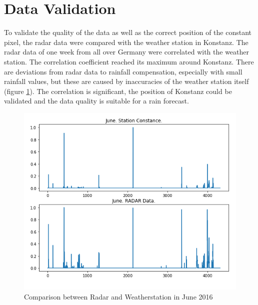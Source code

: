 \documentclass[oneside]{htwg-report}
\begin{document}
\section*{Data Validation}\label{data validation}
\begin{sloppypar}
To validate the quality of the data as well as the correct position of the constant pixel, the radar data were compared with the weather station in Konstanz.
The radar data of one week from all over Germany were correlated with the weather station.
The correlation coefficient reached its maximum around Konstanz.
There are deviations from radar data to rainfall compensation, especially with small rainfall values, but these are caused by inaccuracies of the weather station itself (figure \ref{fig:radar_station_daten_vergleich_June}).
The correlation is significant, the position of Konstanz could be validated and the data quality is suitable for a rain forecast.
\end{sloppypar}

\begin{figure}[ht]
    \centering
    \includegraphics[width=0.8\linewidth,angle=0]{../abb/radar_station_daten_vergleich_June.png}
    \caption[Datenaufbereitung]{Comparison between Radar and Weatherstation in June 2016}
    \label{fig:radar_station_daten_vergleich_June}
\end{figure}
\end{document}
